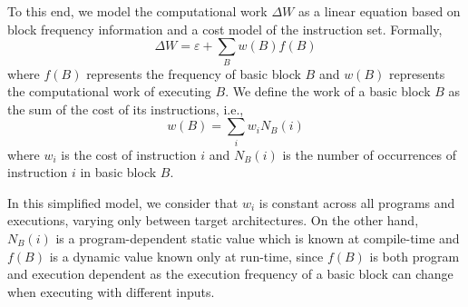 To this end, we model the computational work $\Delta W$ as a linear equation based on block frequency information and a cost model of the instruction set.
Formally,
\[
\Delta W = \varepsilon + \sum_{B} w(B)f(B)
\]
where $f(B)$ represents the frequency of basic block $B$ and $w(B)$ represents the computational work of executing $B$.
We define the work of a basic block $B$ as the sum of the cost of its instructions, i.e.,
\[
w(B) = \sum_{i} w_i N_B(i)
\]
where $w_i$ is the cost of instruction $i$ and $N_B(i)$ is the number of occurrences of instruction $i$ in basic block $B$.

In this simplified model, we consider that $w_i$ is constant across all programs and executions, varying only between target architectures.
On the other hand, $N_B(i)$ is a program-dependent static value which is known at compile-time and $f(B)$ is a dynamic value known only at run-time,
since $f(B)$ is both program and execution dependent as the execution frequency of a basic block can change when executing with different inputs.


%

